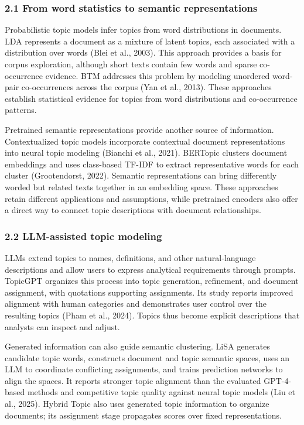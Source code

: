 \documentclass[
  11pt,
  a4paper,
]{article}
\begin{document}
\subsubsection{2.1 From word statistics to semantic
representations}\label{from-word-statistics-to-semantic-representations}

Probabilistic topic models infer topics from word distributions in
documents. LDA represents a document as a mixture of latent topics, each
associated with a distribution over words (Blei et al., 2003). This
approach provides a basis for corpus exploration, although short texts
contain few words and sparse co-occurrence evidence. BTM addresses this
problem by modeling unordered word-pair co-occurrences across the corpus
(Yan et al., 2013). These approaches establish statistical evidence for
topics from word distributions and co-occurrence patterns.

Pretrained semantic representations provide another source of
information. Contextualized topic models incorporate contextual document
representations into neural topic modeling (Bianchi et al., 2021).
BERTopic clusters document embeddings and uses class-based TF-IDF to
extract representative words for each cluster (Grootendorst, 2022).
Semantic representations can bring differently worded but related texts
together in an embedding space. These approaches retain different
applications and assumptions, while pretrained encoders also offer a
direct way to connect topic descriptions with document relationships.

\subsubsection{2.2 LLM-assisted topic
modeling}\label{llm-assisted-topic-modeling}

LLMs extend topics to names, definitions, and other natural-language
descriptions and allow users to express analytical requirements through
prompts. TopicGPT organizes this process into topic generation,
refinement, and document assignment, with quotations supporting
assignments. Its study reports improved alignment with human categories
and demonstrates user control over the resulting topics (Pham et al.,
2024). Topics thus become explicit descriptions that analysts can
inspect and adjust.

Generated information can also guide semantic clustering. LiSA generates
candidate topic words, constructs document and topic semantic spaces,
uses an LLM to coordinate conflicting assignments, and trains prediction
networks to align the spaces. It reports stronger topic alignment than
the evaluated GPT-4-based methods and competitive topic quality against
neural topic models (Liu et al., 2025). Hybrid Topic also uses generated
topic information to organize documents; its assignment stage propagates
scores over fixed representations.
\end{document}
